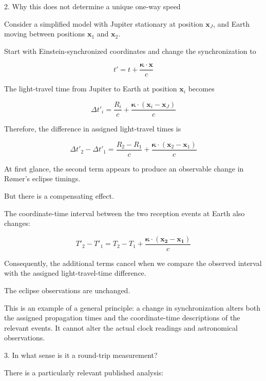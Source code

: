 \documentclass[a4paper]{article}
\theoremstyle{plain}
\theoremstyle{definition}
\newcommand{\vect}[1]{\mathbf{#1}}
\begin{document}
2. Why this does not determine a unique one-way speed

Consider a simplified model with Jupiter stationary at position
$\vect{x}_J$, and Earth moving between positions $\vect{x}_1$ and
$\vect{x}_2$.

Start with Einstein-synchronized coordinates and change the
synchronization to

\begin{equation}
t' = t + \frac{\vect{\boldsymbol{\kappa}} \cdot \vect{x}}{c}
\end{equation}

The light-travel time from Jupiter to Earth at position $\vect{x}_i$
becomes

\begin{equation}
\Delta t'_i = \frac{R_i}{c} + \frac{\vect{\boldsymbol{\kappa}} \cdot (\vect{x}_i - \vect{x}_J)}{c}
\end{equation}

Therefore, the difference in assigned light-travel times is

\begin{equation}
\Delta t'_2 - \Delta t'_1 = \frac{R_2 - R_1}{c} + \frac{\vect{\boldsymbol{\kappa}} \cdot (\vect{x}_2 - \vect{x}_1)}{c}
\end{equation}

At first glance, the second term appears to produce an observable
change in R\o{}mer's eclipse timings.

But there is a compensating effect.

The coordinate-time interval between the two reception events at Earth
also changes:

\begin{equation}
T'_2 - T'_1 = T_2 - T_1 + \frac{\vect{\boldsymbol{\kappa}} \cdot (\vect{x_2} - \vect{x_1})}{c}
\end{equation}

Consequently, the additional terms cancel when we compare the observed
interval with the assigned light-travel-time difference.

The eclipse observations are unchanged.

This is an example of a general principle: a change in synchronization
alters both the assigned propagation times and the coordinate-time
descriptions of the relevant events.  It cannot alter the actual clock
readings and astronomical observations.

3. In what sense is it a round-trip measurement?

There is a particularly relevant published analysis:
\end{document}
